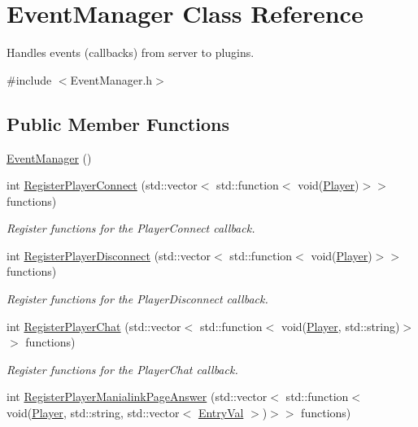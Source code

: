 \hypertarget{classEventManager}{\section{Event\-Manager Class Reference}
\label{classEventManager}
}


Handles events (callbacks) from server to plugins.  




{\ttfamily \#include $<$Event\-Manager.\-h$>$}

\subsection*{Public Member Functions}
\begin{DoxyCompactItemize}
\item 
\hyperlink{classEventManager_a89099b22114f158b5c530edfea52371d}{Event\-Manager} ()
\item 
int \hyperlink{classEventManager_a26aec3d9c2cfbdcb62c0f8e432c2fcae}{Register\-Player\-Connect} (std\-::vector$<$ std\-::function$<$ void(\hyperlink{structPlayer}{Player})$>$$>$ functions)
\begin{DoxyCompactList}\small\item\em Register functions for the Player\-Connect callback. \end{DoxyCompactList}\item 
int \hyperlink{classEventManager_a56ed11f893eb5beebfbf294a196005e5}{Register\-Player\-Disconnect} (std\-::vector$<$ std\-::function$<$ void(\hyperlink{structPlayer}{Player})$>$$>$ functions)
\begin{DoxyCompactList}\small\item\em Register functions for the Player\-Disconnect callback. \end{DoxyCompactList}\item 
int \hyperlink{classEventManager_a05a0b5a63f308f3b948b4eaa132825e3}{Register\-Player\-Chat} (std\-::vector$<$ std\-::function$<$ void(\hyperlink{structPlayer}{Player}, std\-::string)$>$$>$ functions)
\begin{DoxyCompactList}\small\item\em Register functions for the Player\-Chat callback. \end{DoxyCompactList}\item 
int \hyperlink{classEventManager_a5213c8526941c4a67b08d080302dc6bc}{Register\-Player\-Manialink\-Page\-Answer} (std\-::vector$<$ std\-::function$<$ void(\hyperlink{structPlayer}{Player}, std\-::string, std\-::vector$<$ \hyperlink{structEntryVal}{Entry\-Val} $>$)$>$$>$ functions)

\end{DoxyCompactItemize}
